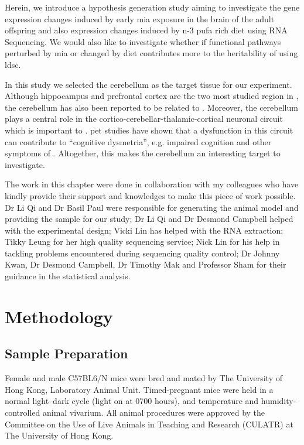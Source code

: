 Herein, we introduce a hypothesis generation study aiming to investigate the gene expression changes induced by early \gls{mia} exposure in the brain of the adult offspring and also expression changes induced by n-3 \gls{pufa} rich diet using RNA Sequencing.
We would also like to investigate whether if functional pathways perturbed by \gls{mia} or changed by diet contributes more to the heritability of  using \gls{ldsc}.

In this study we selected the cerebellum as the target tissue for our experiment. 
Although hippocampus \citep{Velakoulis2006,Nugent2007} and prefrontal cortex \citep{Knable1997,Perlstein2001} are the two most studied region in , the cerebellum has also been reported to be related to  \citep{Yeganeh-Doost2011,Andreasen2008}.
Moreover, the cerebellum plays a central role in the cortico-cerebellar-thalamic-cortical neuronal circuit which is important to .
\Gls{pet} studies have shown that a dysfunction in this circuit can contribute to ``cognitive dysmetria'', e.g. impaired cognition and other symptoms of  \citep{Yeganeh-Doost2011}.
Altogether, this makes the cerebellum an interesting target to investigate.

The work in this chapter were done in collaboration with my colleagues who have kindly provide their support and knowledges to make this piece of work possible.
Dr Li Qi and Dr Basil Paul were responsible for generating the animal model and providing the sample for our study;
Dr Li Qi and Dr Desmond Campbell helped with the experimental design;
Vicki Lin has helped with the RNA extraction; 
Tikky Leung for her high quality sequencing service;
Nick Lin for his help in tackling problems encountered during sequencing quality control; 
Dr Johnny Kwan, Dr Desmond Campbell, Dr Timothy Mak and Professor Sham for their guidance in the statistical analysis.

\section{Methodology}
\subsection{Sample Preparation}
Female and male C57BL6/N mice were bred and mated by The University of Hong Kong, Laboratory Animal Unit. 
Timed-pregnant mice were held in a normal light–dark cycle (light on at 0700 hours), and temperature and humidity-controlled animal vivarium. 
All animal procedures were approved by the Committee on the Use of Live Animals in Teaching and Research (CULATR) at The University of Hong Kong.

